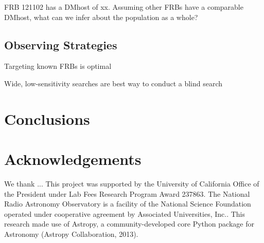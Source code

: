 \documentclass{emulateapj}
\begin{document}
FRB 121102 has a DMhost of xx. Assuming other FRBs have a comparable DMhost, what can we infer about the population as a whole?


\subsection{Observing Strategies}

Targeting known FRBs is optimal

Wide, low-sensitivity searches are best way to conduct a blind search

\cite{2016MNRAS.458L..89C}


\section{Conclusions}





\section*{Acknowledgements}
We thank ...
This project was supported by the University of California Office of the President under Lab Fees Research Program Award 237863. The National Radio Astronomy Observatory is a facility of the National Science Foundation operated under cooperative agreement by Associated Universities, Inc.. This research made use of Astropy, a community-developed core Python package for Astronomy (Astropy Collaboration, 2013).




\end{document}
